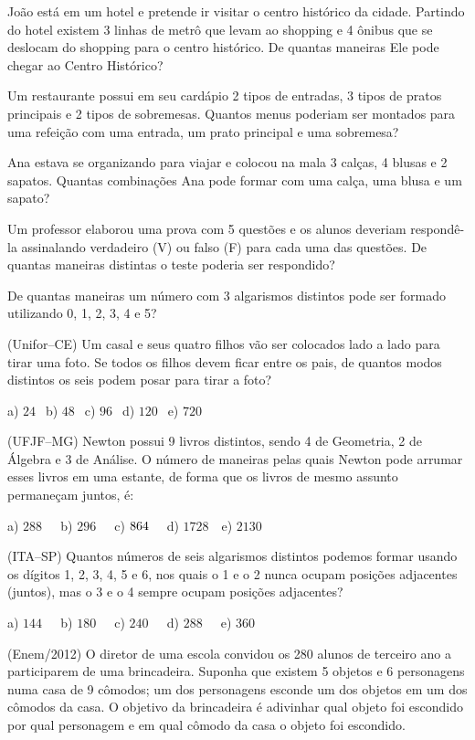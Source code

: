\begin{multicols*}{2}
\setcounter{numexercicio}{0}
		\execnum João está em um hotel e pretende ir visitar o centro histórico da cidade. Partindo do hotel existem 3 linhas de metrô que levam ao shopping e 4 ônibus que se deslocam do shopping para o centro histórico. De quantas maneiras Ele pode chegar ao Centro Histórico?

		\execnum Um restaurante possui em seu cardápio 2 tipos de entradas, 3 tipos de pratos principais e 2 tipos de sobremesas. Quantos menus poderiam ser montados para uma refeição com uma entrada, um prato principal e uma sobremesa?

		\execnum Ana estava se organizando para viajar e colocou na mala 3 calças, 4 blusas e 2 sapatos. Quantas combinações Ana pode formar com uma calça, uma blusa e um sapato?

		\execnum Um professor elaborou uma prova com 5 questões e os alunos deveriam respondê-la assinalando verdadeiro (V) ou falso (F) para cada uma das questões. De quantas maneiras distintas o teste poderia ser respondido?

		\execnum De quantas maneiras um número com 3 algarismos distintos pode ser formado utilizando 0, 1, 2, 3, 4 e 5?

		\execnum (Unifor–CE) Um casal e seus quatro filhos vão ser colocados lado a lado para tirar uma foto. Se todos os filhos devem ficar entre os pais, de quantos modos distintos os seis podem posar para tirar a foto?

		      a) $24 \ \ $ b) $48 \ \ $ c) $96 \ \ $ d) $120 \ \ $ e) $720 \ \ $

		\execnum (UFJF–MG) Newton possui 9 livros distintos, sendo 4 de Geometria, 2 de Álgebra e 3 de Análise. O número de maneiras pelas quais Newton pode arrumar esses livros em uma estante, de forma que os livros de mesmo assunto permaneçam juntos, é:

		      a) $288 \ \ \ \ \ $ b) $296 \ \ \ \ \ $ c) $864 \ \ \ \ \\ $ d) $1728 \ \ \ $ e) $2130 \ \ $

		\execnum (ITA–SP) Quantos números de seis algarismos distintos podemos formar usando os dígitos 1, 2, 3, 4, 5 e 6, nos quais o 1 e o 2 nunca ocupam posições adjacentes (juntos), mas o 3 e o 4 sempre ocupam posições adjacentes?

		      a) $144 \ \ \ \ \ $ b) $180 \ \ \ \ \ $ c) $240 \ \ \ \ \ $ d) $288 \ \ \ \ \ $ e) $360 \ \ $

		\execnum (Enem/2012) O diretor de uma escola convidou os 280 alunos de terceiro ano a participarem de uma brincadeira. Suponha que existem 5 objetos e 6 personagens numa casa de 9 cômodos; um dos personagens esconde um dos objetos em um dos cômodos da casa. O objetivo da brincadeira é adivinhar qual objeto foi escondido por qual personagem e em qual cômodo da casa o objeto foi escondido.


\end{multicols*}
